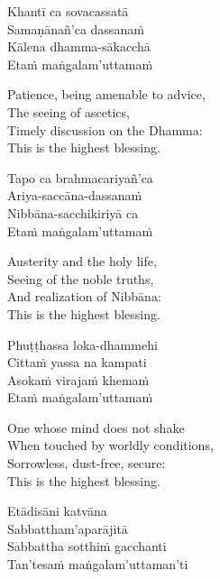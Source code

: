 \begin{pali-hang-continued}
  Khantī ca sovacassatā\\
  Samaṇānañ'ca dassanaṁ\\
  Kālena dhamma-sākacchā\\
  Etaṁ maṅgalam'uttamaṁ
\end{pali-hang-continued}

\begin{english-verses}
  Patience, being amenable to advice,\\
  The seeing of ascetics,\\
  Timely discussion on the Dhamma:\\
  This is the highest blessing.
\end{english-verses}

\begin{pali-hang-continued}
  Tapo ca brahmacariyañ'ca\\
  Ariya-saccāna-dassanaṁ\\
  Nibbāna-sacchikiriyā ca\\
  Etaṁ maṅgalam'uttamaṁ
\end{pali-hang-continued}

\begin{english-verses}
  Austerity and the holy life,\\
  Seeing of the noble truths,\\
  And realization of Nibbāna:\\
  This is the highest blessing.
\end{english-verses}

\begin{pali-hang-continued}
  Phuṭṭhassa loka-dhammehi\\
  Cittaṁ yassa na kampati\\
  Asokaṁ virajaṁ khemaṁ\\
  Etaṁ maṅgalam'uttamaṁ
\end{pali-hang-continued}

\begin{english-verses}
  One whose mind does not shake\\
  When touched by worldly conditions,\\
  Sorrowless, dust-free, secure:\\
  This is the highest blessing.
\end{english-verses}

\begin{pali-hang-continued}
  Etādisāni katvāna\\
  Sabbattham'aparājitā\\
  Sabbattha sotthiṁ gacchanti\\
  Tan'tesaṁ maṅgalam'uttaman'ti
\end{pali-hang-continued}

